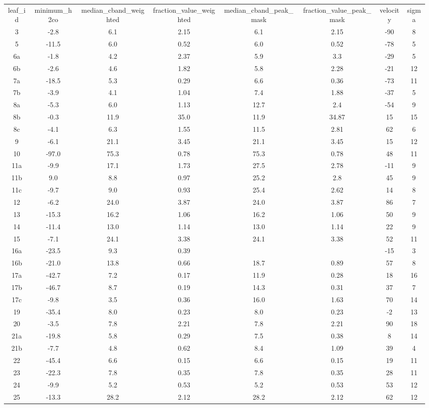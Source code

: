 \begin{table}
\begin{tabular}{cccccccc}
leaf_id & minimum_h2co & median_cband_weighted & fraction_value_weighted & median_cband_peak_mask & fraction_value_peak_mask & velocity & sigma \\
3 & -2.8 & 6.1 & 2.15 & 6.1 & 2.15 & -90 & 8 \\
5 & -11.5 & 6.0 & 0.52 & 6.0 & 0.52 & -78 & 5 \\
6a & -1.8 & 4.2 & 2.37 & 5.9 & 3.3 & -29 & 5 \\
6b & -2.6 & 4.6 & 1.82 & 5.8 & 2.28 & -21 & 12 \\
7a & -18.5 & 5.3 & 0.29 & 6.6 & 0.36 & -73 & 11 \\
7b & -3.9 & 4.1 & 1.04 & 7.4 & 1.88 & -37 & 5 \\
8a & -5.3 & 6.0 & 1.13 & 12.7 & 2.4 & -54 & 9 \\
8b & -0.3 & 11.9 & 35.0 & 11.9 & 34.87 & 15 & 15 \\
8c & -4.1 & 6.3 & 1.55 & 11.5 & 2.81 & 62 & 6 \\
9 & -6.1 & 21.1 & 3.45 & 21.1 & 3.45 & 15 & 12 \\
10 & -97.0 & 75.3 & 0.78 & 75.3 & 0.78 & 48 & 11 \\
11a & -9.9 & 17.1 & 1.73 & 27.5 & 2.78 & -11 & 9 \\
11b & 9.0 & 8.8 & 0.97 & 25.2 & 2.8 & 45 & 9 \\
11c & -9.7 & 9.0 & 0.93 & 25.4 & 2.62 & 14 & 8 \\
12 & -6.2 & 24.0 & 3.87 & 24.0 & 3.87 & 86 & 7 \\
13 & -15.3 & 16.2 & 1.06 & 16.2 & 1.06 & 50 & 9 \\
14 & -11.4 & 13.0 & 1.14 & 13.0 & 1.14 & 22 & 9 \\
15 & -7.1 & 24.1 & 3.38 & 24.1 & 3.38 & 52 & 11 \\
16a & -23.5 & 9.3 & 0.39 &  &  & -15 & 3 \\
16b & -21.0 & 13.8 & 0.66 & 18.7 & 0.89 & 57 & 8 \\
17a & -42.7 & 7.2 & 0.17 & 11.9 & 0.28 & 18 & 16 \\
17b & -46.7 & 8.7 & 0.19 & 14.3 & 0.31 & 37 & 7 \\
17c & -9.8 & 3.5 & 0.36 & 16.0 & 1.63 & 70 & 14 \\
19 & -35.4 & 8.0 & 0.23 & 8.0 & 0.23 & -2 & 13 \\
20 & -3.5 & 7.8 & 2.21 & 7.8 & 2.21 & 90 & 18 \\
21a & -19.8 & 5.8 & 0.29 & 7.5 & 0.38 & 8 & 14 \\
21b & -7.7 & 4.8 & 0.62 & 8.4 & 1.09 & 39 & 4 \\
22 & -45.4 & 6.6 & 0.15 & 6.6 & 0.15 & 19 & 11 \\
23 & -22.3 & 7.8 & 0.35 & 7.8 & 0.35 & 28 & 11 \\
24 & -9.9 & 5.2 & 0.53 & 5.2 & 0.53 & 53 & 12 \\
25 & -13.3 & 28.2 & 2.12 & 28.2 & 2.12 & 62 & 12 \\
\end{tabular}
\end{table}
